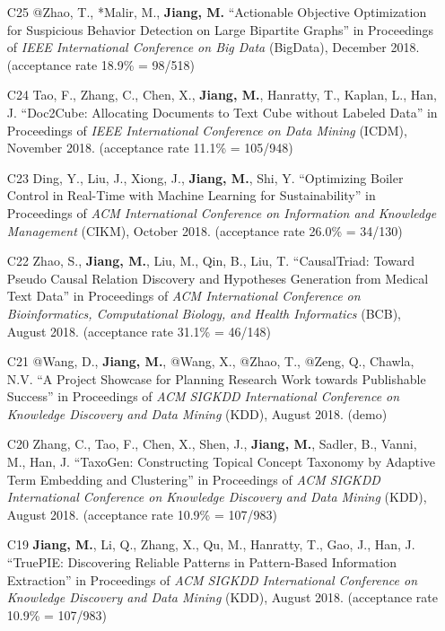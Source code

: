 \documentclass[10pt]{article}
\newenvironment{myindentpar}[1]%
{\begin{list}{}%
         {\setlength{\leftmargin}{#1}}%
         \item[]%
}
{\end{list}}
\newcounter{list}
\begin{document}
\begin{myindentpar}{0.00cm}
\begin{enumerate}[leftmargin=.5cm]
\item[C25] @Zhao, T., *Malir, M., \textbf{Jiang, M.} ``Actionable Objective Optimization for Suspicious Behavior Detection on Large Bipartite Graphs'' in Proceedings of \textit{IEEE International Conference on Big Data} (BigData), December 2018. (acceptance rate 18.9\% = 98/518)

\item[C24] Tao, F., Zhang, C., Chen, X., \textbf{Jiang, M.}, Hanratty, T., Kaplan, L., Han, J. ``Doc2Cube: Allocating Documents to Text Cube without Labeled Data'' in Proceedings of \textit{IEEE International Conference on Data Mining} (ICDM), November 2018. (acceptance rate 11.1\% = 105/948)

\item[C23] Ding, Y., Liu, J., Xiong, J., \textbf{Jiang, M.}, Shi, Y. ``Optimizing Boiler Control in Real-Time with Machine Learning for Sustainability'' in Proceedings of \textit{ACM International Conference on Information and Knowledge Management} (CIKM), October 2018. (acceptance rate 26.0\% = 34/130)

\item[C22] Zhao, S., \textbf{Jiang, M.}, Liu, M., Qin, B., Liu, T. ``CausalTriad: Toward Pseudo Causal Relation Discovery and Hypotheses Generation from Medical Text Data'' in Proceedings of \textit{ACM International Conference on Bioinformatics, Computational Biology, and Health Informatics} (BCB), August 2018. (acceptance rate 31.1\% = 46/148)

\item[C21] @Wang, D., \textbf{Jiang, M.}, @Wang, X., @Zhao, T., @Zeng, Q., Chawla, N.V. ``A Project Showcase for Planning Research Work towards Publishable Success'' in Proceedings of \textit{ACM SIGKDD International Conference on Knowledge Discovery and Data Mining} (KDD), August 2018. (demo)

\item[C20] Zhang, C., Tao, F., Chen, X., Shen, J., \textbf{Jiang, M.}, Sadler, B., Vanni, M., Han, J. ``TaxoGen: Constructing Topical Concept Taxonomy by Adaptive Term Embedding and Clustering'' in Proceedings of \textit{ACM SIGKDD International Conference on Knowledge Discovery and Data Mining} (KDD), August 2018. (acceptance rate 10.9\% = 107/983)

\item[C19] \textbf{Jiang, M.}, Li, Q., Zhang, X., Qu, M., Hanratty, T., Gao, J., Han, J. ``TruePIE: Discovering Reliable Patterns in Pattern-Based Information Extraction'' in Proceedings of \textit{ACM SIGKDD International Conference on Knowledge Discovery and Data Mining} (KDD), August 2018. (acceptance rate 10.9\% = 107/983)
	

\end{enumerate}
\end{myindentpar}
\end{document}
